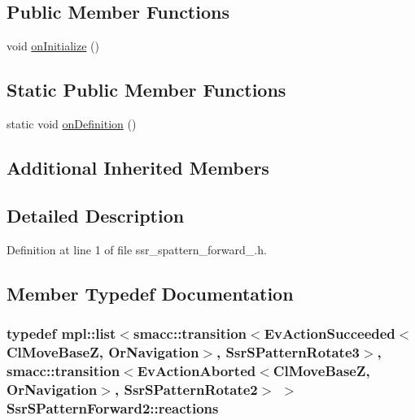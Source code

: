 \subsection*{Public Member Functions}
\begin{DoxyCompactItemize}
\item 
void \hyperlink{structSsrSPatternForward2_a9271aa70005c791d87e03a2b1c02900a}{on\+Initialize} ()
\end{DoxyCompactItemize}
\subsection*{Static Public Member Functions}
\begin{DoxyCompactItemize}
\item 
static void \hyperlink{structSsrSPatternForward2_a9b2bc23e0f05d3f5b5db22cc0489c5a6}{on\+Definition} ()
\end{DoxyCompactItemize}
\subsection*{Additional Inherited Members}


\subsection{Detailed Description}


Definition at line 1 of file ssr\+\_\+spattern\+\_\+forward\+\_.\+h.



\subsection{Member Typedef Documentation}
\subsubsection[{\texorpdfstring{reactions}{reactions}}]{\setlength{\rightskip}{0pt plus 5cm}typedef mpl\+::list$<${\bf smacc\+::transition}$<$Ev\+Action\+Succeeded$<$Cl\+Move\+BaseZ, Or\+Navigation$>$, {\bf Ssr\+S\+Pattern\+Rotate3}$>$, {\bf smacc\+::transition}$<$Ev\+Action\+Aborted$<$Cl\+Move\+BaseZ, Or\+Navigation$>$, {\bf Ssr\+S\+Pattern\+Rotate2}$>$ $>$ {\bf Ssr\+S\+Pattern\+Forward2\+::reactions}}\hypertarget{structSsrSPatternForward2_a8e3716033d5272a4bd6c42e751bf36b6}{}\label{structSsrSPatternForward2_a8e3716033d5272a4bd6c42e751bf36b6}


